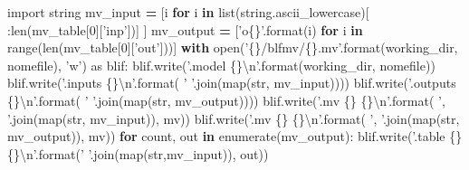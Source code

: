 \documentclass[italian,]{book}
\newenvironment{Shaded}{\begin{snugshade}}{\end{snugshade}}
\newcommand{\BuiltInTok}[1]{#1}
\newcommand{\CharTok}[1]{\textcolor[rgb]{0.31,0.60,0.02}{#1}}
\newcommand{\ControlFlowTok}[1]{\textcolor[rgb]{0.13,0.29,0.53}{\textbf{#1}}}
\newcommand{\DecValTok}[1]{\textcolor[rgb]{0.00,0.00,0.81}{#1}}
\newcommand{\ImportTok}[1]{#1}
\newcommand{\KeywordTok}[1]{\textcolor[rgb]{0.13,0.29,0.53}{\textbf{#1}}}
\newcommand{\NormalTok}[1]{#1}
\newcommand{\OperatorTok}[1]{\textcolor[rgb]{0.81,0.36,0.00}{\textbf{#1}}}
\newcommand{\SpecialCharTok}[1]{\textcolor[rgb]{0.00,0.00,0.00}{#1}}
\newcommand{\StringTok}[1]{\textcolor[rgb]{0.31,0.60,0.02}{#1}}
\begin{document}
\begin{Shaded}
\begin{Highlighting}[]
\ImportTok{import}\NormalTok{ string}
\NormalTok{mv_input }\OperatorTok{=}\NormalTok{ [i }\ControlFlowTok{for}\NormalTok{ i }\KeywordTok{in} \BuiltInTok{list}\NormalTok{(string.ascii_lowercase)[}
\NormalTok{    :}\BuiltInTok{len}\NormalTok{(mv_table[}\DecValTok{0}\NormalTok{][}\StringTok{'inp'}\NormalTok{])]}
\NormalTok{  ]}
\NormalTok{mv_output }\OperatorTok{=}\NormalTok{ [}\StringTok{'o}\SpecialCharTok{\{\}}\StringTok{'}\NormalTok{.}\BuiltInTok{format}\NormalTok{(i) }\ControlFlowTok{for}\NormalTok{ i }\KeywordTok{in} \BuiltInTok{range}\NormalTok{(}\BuiltInTok{len}\NormalTok{(mv_table[}\DecValTok{0}\NormalTok{][}\StringTok{'out'}\NormalTok{]))]}
\ControlFlowTok{with} \BuiltInTok{open}\NormalTok{(}\StringTok{'}\SpecialCharTok{\{\}}\StringTok{/blfmv/}\SpecialCharTok{\{\}}\StringTok{.mv'}\NormalTok{.}\BuiltInTok{format}\NormalTok{(working_dir, nomefile), }\StringTok{'w'}\NormalTok{) }\ImportTok{as}\NormalTok{ blif:}
\NormalTok{  blif.write(}\StringTok{'.model }\SpecialCharTok{\{\}}\CharTok{\textbackslash{}n}\StringTok{'}\NormalTok{.}\BuiltInTok{format}\NormalTok{(working_dir, nomefile))}
\NormalTok{  blif.write(}\StringTok{'.inputs }\SpecialCharTok{\{\}}\CharTok{\textbackslash{}n}\StringTok{'}\NormalTok{.}\BuiltInTok{format}\NormalTok{(}
      \StringTok{' '}\NormalTok{.join(}\BuiltInTok{map}\NormalTok{(}\BuiltInTok{str}\NormalTok{, mv_input))))}
\NormalTok{  blif.write(}\StringTok{'.outputs }\SpecialCharTok{\{\}}\CharTok{\textbackslash{}n}\StringTok{'}\NormalTok{.}\BuiltInTok{format}\NormalTok{(}
      \StringTok{' '}\NormalTok{.join(}\BuiltInTok{map}\NormalTok{(}\BuiltInTok{str}\NormalTok{, mv_output))))}
\NormalTok{  blif.write(}\StringTok{'.mv }\SpecialCharTok{\{\}}\StringTok{ }\SpecialCharTok{\{\}}\CharTok{\textbackslash{}n}\StringTok{'}\NormalTok{.}\BuiltInTok{format}\NormalTok{(}
      \StringTok{', '}\NormalTok{.join(}\BuiltInTok{map}\NormalTok{(}\BuiltInTok{str}\NormalTok{, mv_input)), mv))}
\NormalTok{  blif.write(}\StringTok{'.mv }\SpecialCharTok{\{\}}\StringTok{ }\SpecialCharTok{\{\}}\CharTok{\textbackslash{}n}\StringTok{'}\NormalTok{.}\BuiltInTok{format}\NormalTok{(}
      \StringTok{', '}\NormalTok{.join(}\BuiltInTok{map}\NormalTok{(}\BuiltInTok{str}\NormalTok{, mv_output)), mv))}
  \ControlFlowTok{for}\NormalTok{ count, out }\KeywordTok{in} \BuiltInTok{enumerate}\NormalTok{(mv_output):}
\NormalTok{      blif.write(}\StringTok{'.table }\SpecialCharTok{\{\}}\StringTok{ }\SpecialCharTok{\{\}}\CharTok{\textbackslash{}n}\StringTok{'}\NormalTok{.}\BuiltInTok{format}\NormalTok{(}\StringTok{' '}\NormalTok{.join(}\BuiltInTok{map}\NormalTok{(}\BuiltInTok{str}\NormalTok{,mv_input)), out))}

\end{Highlighting}
\end{Shaded}
\end{document}
